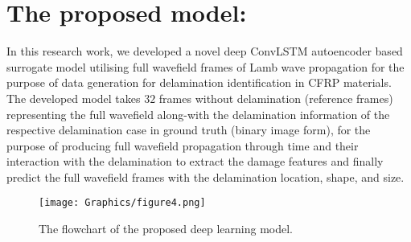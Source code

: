 \section{The proposed model:}
\label{proposed_approach}
In this research work, we developed a novel deep ConvLSTM autoencoder 
based surrogate model utilising full wavefield frames of Lamb wave propagation 
for the purpose of data generation for delamination identification in CFRP 
materials.
The developed model takes \(32\) frames without delamination 
(reference frames) representing the full wavefield along-with the delamination 
information of the respective delamination case in ground truth (binary image 
form), for the purpose of producing full wavefield propagation through time and 
their interaction with the delamination to extract the damage features and 
finally predict the full wavefield frames with the delamination location, 
shape, and size.
\begin{figure} [h!]
	\begin{center}
		\texttt{[image: Graphics/figure4.png]}
	\end{center}
	\caption{The flowchart of the proposed deep learning model.} 
	\label{fig:proposed_model}
\end{figure}

